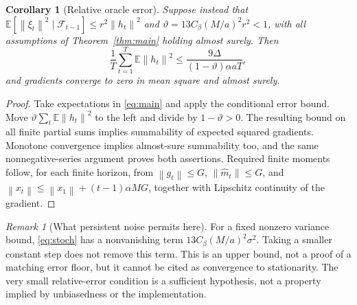 \documentclass[11pt,a4paper]{article}
\newtheorem{corollary}[theorem]{Corollary}
\theoremstyle{definition}
\theoremstyle{remark}
\newtheorem{remark}[theorem]{Remark}
\newcommand{\E}{\mathbb E}
\newcommand{\norm}[1]{\left\lVert#1\right\rVert}
\begin{document}
\begin{corollary}[Relative oracle error]\label{cor:relative}
Suppose instead that
$\E[\norm{\xi_t}^2\mid\mathcal F_{t-1}]\le r^2\norm{h_t}^2$ and
$\vartheta=13C_\beta(M/a)^2r^2<1$, with all assumptions of
Theorem~\ref{thm:main} holding almost surely. Then
\[
 \frac1T\sum_{t=1}^T\E\norm{h_t}^2
 \le\frac{9\Delta}{(1-\vartheta)\alpha aT},
\]
and gradients converge to zero in mean square and almost surely.
\end{corollary}
\begin{proof}
Take expectations in \eqref{eq:main} and apply the conditional error bound.
Move $\vartheta\sum_t\E\norm{h_t}^2$ to the left and divide by
$1-\vartheta>0$. The resulting bound on all finite partial sums implies
summability of expected squared gradients. Monotone convergence implies
almost-sure summability too, and the same nonnegative-series argument proves
both assertions. Required finite moments follow, for each finite horizon,
from $\norm{g_t}\le G$, $\norm{\widehat m_t}\le G$, and
$\norm{x_t}\le\norm{x_1}+(t-1)\alpha MG$, together with Lipschitz continuity
of the gradient.
\end{proof}

\begin{remark}[What persistent noise permits here]
For a fixed nonzero variance bound, \eqref{eq:stoch} has a nonvanishing
term $13C_\beta(M/a)^2\sigma^2$. Taking a smaller constant step does not
remove this term. This is an upper bound, not a proof of a matching error
floor, but it cannot be cited as convergence to stationarity. The very small
relative-error condition is a sufficient hypothesis, not a property implied
by unbiasedness or the implementation.
\end{remark}
\end{document}

